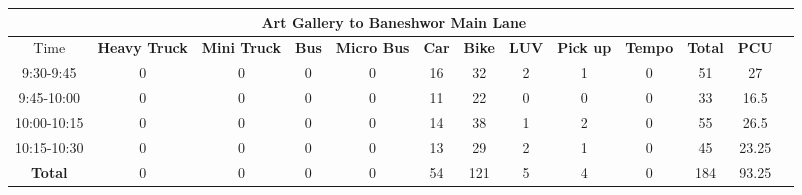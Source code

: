 \begin{landscape}
\begin{table}[h!]
\vspace{0.5cm}
\begin{tabular}{|c|c|c|c|c|c|c|c|c|c|c|c|c|}
    \hline
    \multicolumn{12}{|c|}{\textbf{Art Gallery to Baneshwor Main Lane}} \\
    \hline
        Time & \textbf{Heavy Truck} & \textbf{Mini Truck} & \textbf{Bus} & \textbf{Micro Bus} & \textbf{Car} & \textbf{Bike} & \textbf{LUV} & \textbf{Pick up} & \textbf{Tempo} & \textbf{\textbf{Total}} & \textbf{PCU} \\
    \hline
9:30-9:45	&0	&0	&0	&0	&16	&32	&2	&1	&0	&51	&27 \\ \hline
9:45-10:00	&0	&0	&0	&0	&11	&22	&0	&0	&0	&33	&16.5 \\ \hline
10:00-10:15	&0	&0	&0	&0	&14	&38	&1	&2	&0	&55	&26.5 \\ \hline
10:15-10:30	&0	&0	&0	&0	&13	&29	&2	&1	&0	&45	&23.25 \\ \hline
\textbf{Total}	&0	&0	&0	&0	&54	&121	&5	&4	&0	&184	&93.25 \\ \hline

\end{tabular}

\end{table}
\end{landscape}

